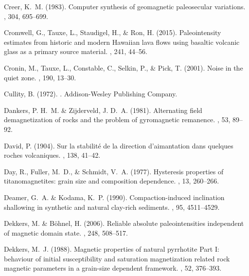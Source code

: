 Creer, K.~M. (1983).
\newblock Computer synthesis of geomagnetic paleosecular variations.
, 304, 695--699.

Cromwell, G., Tauxe, L., Staudigel, H., \& Ron, H. (2015).
\newblock Paleointensity estimates from historic and modern Hawaiian lava flows
  using basaltic volcanic glass as a primary source material.
, 241, 44--56.

Cronin, M., Tauxe, L., Constable, C., Selkin, P., \& Pick, T. (2001).
\newblock Noise in the quiet zone.
, 190, 13--30.

Cullity, B. (1972).
.
\newblock Addison-Wesley Publishing Company.

Dankers, P. H.~M. \& Zijderveld, J. D.~A. (1981).
\newblock Alternating field demagnetization of rocks and the problem of
  gyromagnetic remanence.
, 53, 89--92.

David, P. (1904).
\newblock Sur la stabilit\'e de la direction d'aimantation dans quelques roches
  volcaniques.
, 138, 41--42.

Day, R., Fuller, M.~D., \& Schmidt, V.~A. (1977).
\newblock Hysteresis properties of titanomagnetites: grain size and composition
  dependence.
, 13, 260--266.

Deamer, G.~A. \& Kodama, K.~P. (1990).
\newblock Compaction-induced inclination shallowing in synthetic and natural
  clay-rich sediments.
, 95, 4511--4529.

Dekkers, M. \& B\"ohnel, H. (2006).
\newblock Reliable absolute paleointensities independent of magnetic domain
  state.
, 248, 508--517.

Dekkers, M.~J. (1988).
\newblock Magnetic properties of natural pyrrhotite Part {I}: behaviour of
  initial susceptibility and saturation magnetization related rock magnetic
  parameters in a grain-size dependent framework.
, 52, 376--393.

